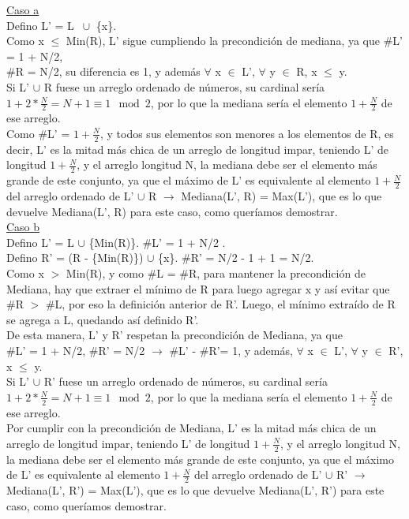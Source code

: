\documentclass{article}
\theoremstyle{definition}
\theoremstyle{remark}
\begin{document}
\underline{Caso a}\\

Defino L' = L $\ \cup$ \{x\}.\\

Como x $\leq$ Min(R), L' sigue cumpliendo la precondición de mediana, ya que \#L' = 1 + N/2, \\ \#R = N/2, su diferencia es 1, y además $\forall$ x $\in$ L', $\forall$ y $\in$ R, x $\leq$ y. \\
Si L' $\cup$ R fuese un arreglo ordenado de números, su cardinal sería $1 + 2 * \frac{N}{2} = N + 1 \equiv 1 \mod 2$, por lo que la mediana sería el elemento $1 + \frac{N}{2}$ de ese arreglo. \\
Como \#L' = $1 + \frac{N}{2}$, y todos sus elementos son menores a los elementos de R, es decir, L' es la mitad más chica de un arreglo de longitud impar, teniendo L' de longitud $1 + \frac{N}{2}$, y el arreglo longitud N, la mediana debe ser el elemento más grande de este conjunto, ya que el máximo de L' es equivalente al elemento $1 + \frac{N}{2}$ del arreglo ordenado de L' $\cup$ R $\rightarrow$ Mediana(L', R) = Max(L'), que es lo que devuelve Mediana(L', R) para este caso, como queríamos demostrar.\\

\underline{Caso b}\\

Defino L' = L $\cup$ \{Min(R)\}.  \#L' = 1 + N/2 . \\

Defino R' = (R - \{Min(R)\}) $\cup$ \{x\}. \#R' = N/2 - 1 + 1 = N/2. \\

Como x $>$ Min(R), y como \#L = \#R, para mantener la precondición de Mediana, hay que extraer el mínimo de R para luego agregar x y así evitar que \#R $>$ \#L, por eso la definición anterior de R'. Luego, el mínimo extraído de R se agrega a L, quedando así definido R'. \\
De esta manera, L' y R' respetan la precondición de Mediana, ya que \\ \#L' = 1 + N/2, \#R' = N/2 $\rightarrow$ \#L' - \#R'= 1, y además, $\forall$ x $\in$ L', $\forall$ y $\in$ R', x $\leq$ y. \\
Si L' $\cup$ R' fuese un arreglo ordenado de números, su cardinal sería $1 + 2 * \frac{N}{2} = N + 1 \equiv 1 \mod 2$, por lo que la mediana sería el elemento $1 + \frac{N}{2}$ de ese arreglo. \\
Por cumplir con la precondición de Mediana, L' es la mitad más chica de un arreglo de longitud impar, teniendo L' de longitud $1 + \frac{N}{2}$, y el arreglo longitud N, la mediana debe ser el elemento más grande de este conjunto, ya que el máximo de L' es equivalente al elemento $1 + \frac{N}{2}$ del arreglo ordenado de L' $\cup$ R' $\rightarrow$ Mediana(L', R') = Max(L'), que es lo que devuelve Mediana(L', R') para este caso, como queríamos demostrar.\\
\end{document}
